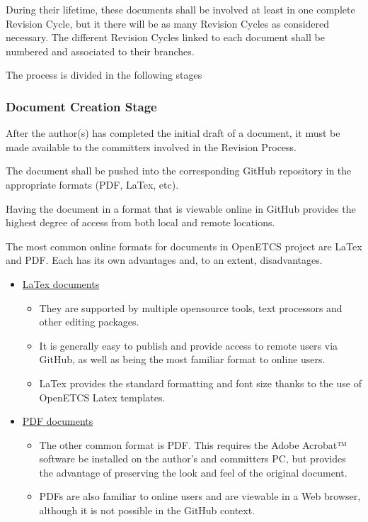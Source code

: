 \documentclass{template/openetcs_article}
\begin{document}
During their lifetime, these documents shall be involved at least in one complete Revision Cycle, but it there will be as many Revision Cycles as considered necessary. The different Revision Cycles linked to each document shall be numbered and associated to their branches.   

The process is divided in the following stages

\subsubsection{Document Creation Stage}

After the author(s) has completed the initial draft of a document, it must be made available to the committers involved in the Revision Process. 

The document shall be pushed into the corresponding GitHub repository in the appropriate formats (PDF, LaTex, etc).

Having the document in a format that is viewable online in GitHub provides the highest degree of access from both local and remote locations. 

The most common online formats for documents in OpenETCS project are LaTex and PDF. Each has its own advantages and, to an extent, disadvantages. 

\begin{itemize}
\item \underline{LaTex documents}
\begin{itemize}
\item They are supported by multiple opensource tools, text processors and other editing packages. 
\item It is generally easy to publish and provide access to remote users via GitHub, as well as being the most familiar format to online users.
\item LaTex provides the standard formatting and font size thanks to the use of OpenETCS Latex templates. 
\end{itemize}
\item \underline{PDF documents}
\begin{itemize}
\item The other common format is PDF. This requires the Adobe Acrobat™ software be installed on the author’s and committers PC, but provides the advantage of preserving the look and feel of the original document. 
\item PDFs are also familiar to online users and are viewable in a Web browser, although it is not possible in the GitHub context.
\end{itemize}
\end{itemize}
\end{document}

